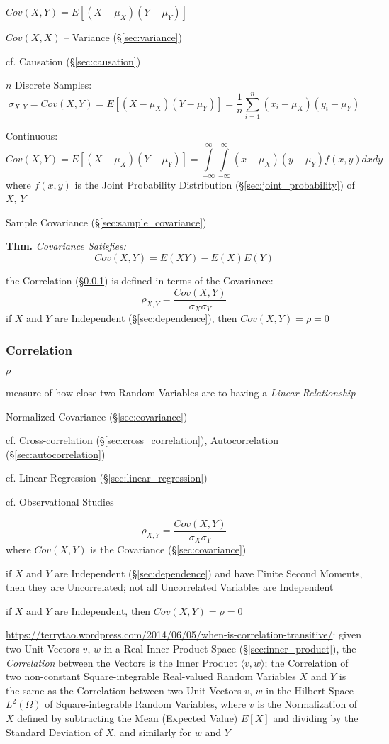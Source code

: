 $Cov(X,Y) = E [(X - \mu_X)(Y - \mu_Y)]$

$Cov(X,X)$ -- Variance (\S\ref{sec:variance})

\fist cf. Causation (\S\ref{sec:causation})

$n$ Discrete Samples:
\[
  \sigma_{X,Y} = Cov(X,Y) = E [(X - \mu_X)(Y - \mu_Y)] =
    \frac{1}{n} \sum_{i=1}^n (x_i - \mu_X) (y_i - \mu_Y)
\]

Continuous:
\[
  Cov(X,Y) = E [(X - \mu_X)(Y - \mu_Y)] =
  \int\limits_{-\infty}^{\infty} \int\limits_{-\infty}^{\infty}
  (x - \mu_X) (y - \mu_Y) f(x,y) dx dy
\]
where $f(x,y)$ is the Joint Probability Distribution
(\S\ref{sec:joint_probability}) of $X$, $Y$

\fist Sample Covariance (\S\ref{sec:sample_covariance})

\textbf{Thm.} \emph{Covariance Satisfies:
  \[
    Cov(X,Y) = E(XY) - E(X)E(Y)
  \]
}

the Correlation (\S\ref{sec:statistical_correlation}) is defined in terms of the
Covariance:
\[
  \rho_{X,Y} = \frac{Cov(X,Y)}{\sigma_X \sigma_Y}
\]
if $X$ and $Y$ are Independent (\S\ref{sec:dependence}), then
$Cov(X,Y) = \rho = 0$



\subsubsection{Correlation}\label{sec:statistical_correlation}

$\rho$

measure of how close two Random Variables are to having a \emph{Linear
  Relationship}

Normalized Covariance (\S\ref{sec:covariance})

\fist cf. Cross-correlation (\S\ref{sec:cross_correlation}), Autocorrelation
(\S\ref{sec:autocorrelation})

\fist cf. Linear Regression (\S\ref{sec:linear_regression})

cf. Observational Studies

\[
  \rho_{X,Y} = \frac{Cov(X,Y)}{\sigma_X \sigma_Y}
\]
where $Cov(X,Y)$ is the Covariance (\S\ref{sec:covariance})

if $X$ and $Y$ are Independent (\S\ref{sec:dependence}) and have Finite Second
Moments, then they are Uncorrelated; not all Uncorrelated Variables are
Independent

if $X$ and $Y$ are Independent, then $Cov(X,Y) = \rho = 0$

\url{https://terrytao.wordpress.com/2014/06/05/when-is-correlation-transitive/}:
given two Unit Vectors $v$, $w$ in a Real Inner Product Space
(\S\ref{sec:inner_product}), the \emph{Correlation} between the Vectors is the
Inner Product $\langle{v,w}\rangle$; the Correlation of two non-constant
Square-integrable Real-valued Random Variables $X$ and $Y$ is the same as the
Correlation between two Unit Vectors $v$, $w$ in the Hilbert Space $L^2(\Omega)$
of Square-integrable Random Variables, where $v$ is the Normalization of $X$
defined by subtracting the Mean (Expected Value) $E[X]$ and dividing by the
Standard Deviation of $X$, and similarly for $w$ and $Y$



